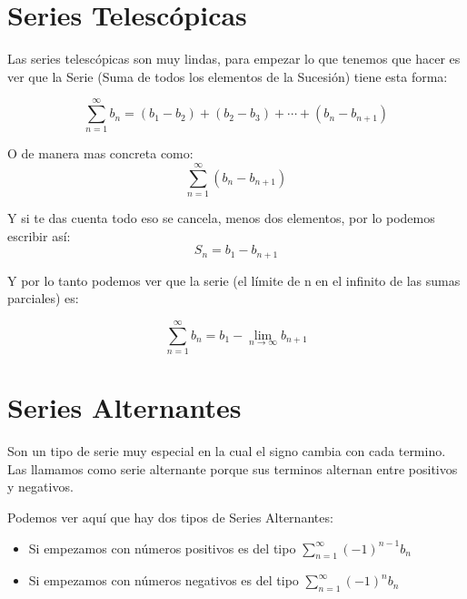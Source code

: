 \documentclass[12pt]{report}							    %
\begin{document}
    \section{Series Telescópicas}

        Las series telescópicas son muy lindas, para empezar lo que tenemos que
        hacer es ver que la Serie (Suma de todos los elementos de la Sucesión)
        tiene esta forma:

        \begin{equation}
            \sum_{n=1}^{\infty} b_n = (b_1-b_2) + (b_2-b_3) +  \cdots + (b_n-b_{n+1})
        \end{equation}

        O de manera mas concreta como:
        \begin{equation}
            \sum_{n=1}^{\infty} (b_{n} - b_{n+1})
        \end{equation}

        Y si te das cuenta todo eso se cancela, menos dos elementos, por lo podemos
        escribir así:
        \begin{equation}
            S_n = b_1 - b_{n+1}
        \end{equation}

        Y por lo tanto podemos ver que la serie (el límite de n en el
        infinito de las sumas parciales) es:

        \begin{equation}
            \sum_{n=1}^{\infty} b_n =  b_1 - \lim_{n \to \infty} b_{n+1}
        \end{equation}




    \clearpage
    \section{Series Alternantes}

        Son un tipo de serie muy especial en la cual el signo cambia con cada
        termino. Las llamamos como serie alternante porque sus terminos alternan
        entre positivos y negativos.

        Podemos ver aquí que hay dos tipos de Series Alternantes:
        \begin{itemize}
            \item Si empezamos con números positivos es del tipo
                $\sum_{n=1}^{\infty} (-1)^{n-1} b_n$
            
            \item Si empezamos con números negativos es del tipo
            $\sum_{n=1}^{\infty} (-1)^n b_n$
        \end{itemize}
\end{document}
